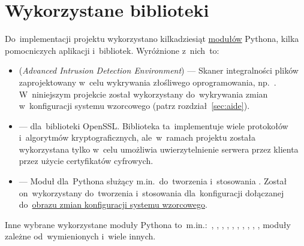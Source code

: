 \documentclass[thesis]{subfiles}
\begin{document}

\section{Wykorzystane biblioteki}
\label{sec:wykorzystane-oprogramowanie}

Do~implementacji projektu wykorzystano kilkadziesiąt \href{https://docs.python.org/dev/tutorial/modules.html}{modułów} Pythona, kilka pomocniczych aplikacji i~bibliotek. Wyróżnione z~nich~to:\mynobreakpar %
\begin{itemize}
	\item {} (\emph{Advanced Intrusion Detection Environment}) --- Skaner integralności plików zaprojektowany w~celu wykrywania złośliwego oprogramowania, np.~. W~niniejszym projekcie został wykorzystany do~wykrywania zmian w~konfiguracji systemu wzorcowego (patrz rozdział~\ref{sec:aide}).
	\item {} ---  dla~biblioteki OpenSSL. Biblioteka ta~implementuje wiele protokołów i~algorytmów kryptograficznych, ale~w~ramach projektu została wykorzystana tylko w~celu umożliwia uwierzytelnienie serwera przez klienta przez użycie certyfikatów cyfrowych.
	\item {} --- Moduł dla~Pythona służący m.in.~do~tworzenia i~stosowania . Został on~wykorzystany do~tworzenia i~stosowania  dla~konfiguracji dołączanej do~\hyperref[sec:obraz-zmian-konfiguracji]{obrazu zmian konfiguracji systemu wzorcowego}.
\end{itemize}

Inne wybrane wykorzystane moduły Pythona to~m.in.:~, , , , , , , , , , moduły zależne od~wymienionych i~wiele innych.
\end{document}
